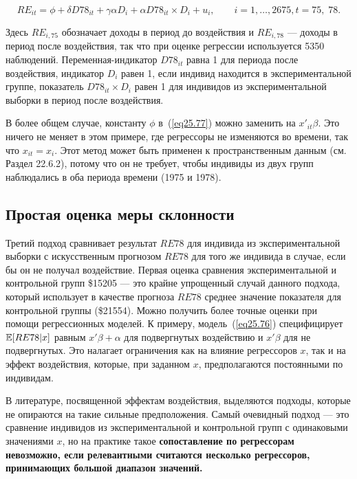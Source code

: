 \begin{equation}
\label{eq25.77}
RE_{it} = \phi + \delta D78_{it} + \gamma \alpha D_i + \alpha D78_{it} \times D_i + u_{i}, \qquad i = 1, \dots, 2675, t = 75, \; 78.
\end{equation}

Здесь $RE_{i, 75}$ обозначает доходы в период до воздействия и $RE_{i,78}$ --- доходы в период после воздействия, так что при оценке регрессии используется 5350 наблюдений. Переменная-индикатор $D78_{it}$ равна 1 для периода после воздействия, индикатор $D_i$ равен 1, если индивид находится в экспериментальной группе, показатель $ D78_{it} \times D_i $ равен 1 для индивидов из экспериментальной выборки в период после воздействия. 

В более общем случае, константу $\phi$ в~(\ref{eq25.77}) можно заменить на $x'_{it} \beta$. Это ничего не меняет в этом примере, где регрессоры не изменяются во времени, так что $x_{it} = x_i$. Этот метод может быть применен к пространственным данным (см. Раздел 22.6.2), потому что он не требует, чтобы индивиды из двух групп наблюдались в оба периода времени (1975 и 1978). 

\subsection{Простая оценка меры склонности}

Третий подход сравнивает результат $RE78$ для индивида из экспериментальной выборки с искусственным прогнозом $RE78$ для того же индивида в случае, если бы он не получал воздействие. Первая оценка сравнения экспериментальной и контрольной групп \$15205 --- это крайне упрощенный случай данного подхода, который использует в качестве прогноза $RE78$ среднее значение показателя для контрольной группы (\$21554). Можно получить более точные оценки при помощи регрессионных моделей. К примеру, модель~(\ref{eq25.76}) специфицирует $\mathbb{E}[RE78|x]$ равным $x'\beta + \alpha$ для подвергнутых воздействию и $x' \beta$ для не подвергнутых. Это налагает ограничения как на влияние регрессоров $x$, так и на эффект воздействия, которые, при заданном $x$, предполагаются постоянными по индивидам. 

В литературе, посвященной эффектам воздействия, выделяются подходы, которые не опираются на такие сильные предположения. Самый очевидный подход --- это сравнение индивидов из экспериментальной и контрольной групп с одинаковыми значениями $x$, но на практике такое \bfseries сопоставление по регрессорам \mdseries невозможно, если релевантными считаются несколько регрессоров, принимающих большой диапазон значений. 


